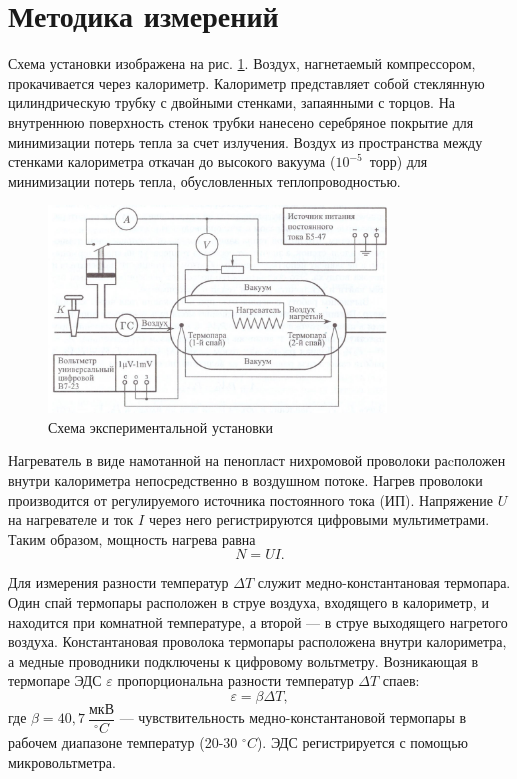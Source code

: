 \documentclass[a4paper, 12pt]{article}
\begin{document}
\section{Методика измерений}

Схема установки изображена на рис. \ref{ris2}. Воздух, нагнетаемый компрессором, прокачивается через калориметр. Калориметр представляет собой стеклянную цилиндрическую трубку с двойными стенками, запаянными с торцов. На внутреннюю поверхность стенок трубки нанесено серебряное покрытие для минимизации потерь тепла за счет излучения. Воздух из пространства между стенками калориметра откачан до высокого вакуума ($10^{-5}$~торр) для минимизации потерь тепла, обусловленных теплопроводностью.

\begin{figure}[h!]
\begin{center}
\includegraphics[width = 0.8\textwidth]{2.jpg}
\caption{Схема экспериментальной установки}
\label{ris2}
\end{center}
\end{figure}

Нагреватель в виде намотанной на пенопласт нихромовой проволоки раcположен внутри калориметра непосредственно в воздушном потоке. Нагрев проволоки производится от регулируемого источника постоянного тока (ИП). Напряжение $U$ на нагревателе и ток $I$ через него регистрируются цифровыми мультиметрами. Таким образом, мощность нагрева равна
\begin{equation}\label{3}
N = UI.
\end{equation}

Для измерения разности температур $\Delta T$ служит медно-константановая термопара. Один спай термопары расположен в струе воздуха, входящего в калориметр, и находится при комнатной температуре, а второй --- в струе выходящего нагретого воздуха. Константановая проволока термопары расположена внутри калориметра, а медные проводники подключены к цифровому вольтметру. Возникающая в термопаре ЭДС $\varepsilon$ пропорциональна разности температур $\Delta T$ спаев:
\begin{equation}\label{4}
\varepsilon = \beta \Delta T,
\end{equation}
где $\beta = 40,7~\dfrac{\text{мкВ}}{ ^{\circ} C}$ --- чувствительность медно-константановой термопары в рабочем диапазоне температур (20-30 $ ^{\circ} C$). ЭДС регистрируется с помощью микровольтметра.
\end{document}
